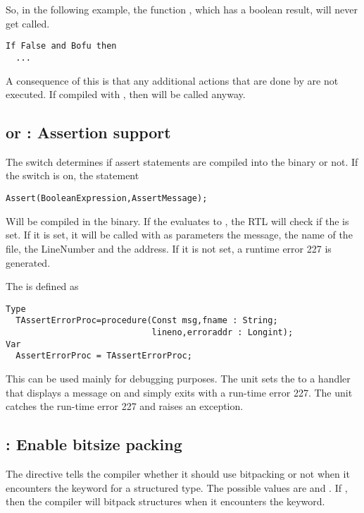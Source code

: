 So, in the following example, the function , which has a boolean
result, will never get called.
\begin{verbatim}
If False and Bofu then
  ...
\end{verbatim}
A consequence of this is that any additional actions that are done by
 are not executed. If compiled with , then
 will be called anyway.

\subsection{ or  : Assertion support}

The  switch determines if assert statements are
compiled into the binary or not. If the switch is on, the statement
\begin{verbatim}
Assert(BooleanExpression,AssertMessage);
\end{verbatim}
Will be compiled in the binary. If the  evaluates to
, the RTL will check if the  is set. If it
is set, it will be called with as parameters the 
message, the name of the file, the LineNumber and the address. If it is not
set, a runtime error 227 is generated.

The  is defined as
\begin{verbatim}
Type
  TAssertErrorProc=procedure(Const msg,fname : String;
                             lineno,erroraddr : Longint);
Var
  AssertErrorProc = TAssertErrorProc;
\end{verbatim}
This can be used mainly for debugging purposes. The  unit sets the
 to a handler that displays a message on 
and simply exits with a run-time error 227. The  unit catches the run-time error 227
and raises an  exception.

\subsection{ : Enable bitsize packing}
\label{se:dirbitpacking}
The  directive tells the compiler whether
it should use bitpacking or not when it encounters the 
keyword for a structured type. The possible values are  and
. If , then the compiler will bitpack structures when it
encounters the  keyword.

